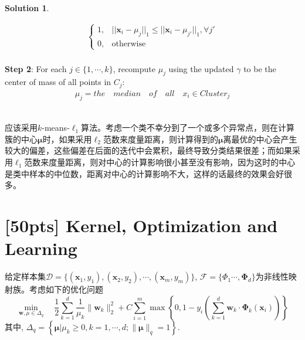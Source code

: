 \documentclass[a4paper,UTF8]{article}
\numberwithin{equation}{section}
\theoremstyle{definition}
\newtheorem*{solution}{Solution}
\begin{document}
\begin{solution}
\begin{algorithm}[]
{\begin{align*}
\begin{cases}
1,& ||\mathbf x_i - \mu_j||_1 \le ||\mathbf x_i - \mu_{j'}||_1, \forall j' \\
0, & \text{otherwise} 
\end{cases}
\end{align*}\\
\textbf{Step 2}: For each $j \in \{1, \cdots, k\}$, recompute $\mu_j$ using the updated $\gamma$ to be the center of mass of all points in $C_j$: 
\begin{align*}
\mu_j = the\quad median\quad of\quad all\quad x_i \in Cluster_j
\end{align*}
}
\end{algorithm}\\
应该采用$k$-means-$\ell_1$算法。考虑一个类不幸分到了一个或多个异常点，则在计算簇的中心$\boldsymbol\mu$时，如果采用$\ell_2$范数来度量距离，则计算得到的$\boldsymbol\mu$离最优的中心会产生较大的偏差，这些偏差在后面的迭代中会累积，最终导致分类结果很差；而如果采用$\ell_1$范数来度量距离，则对中心的计算影响很小甚至没有影响，因为这时的中心是类中样本的中位数，距离对中心的计算影响不大，这样的话最终的效果会好很多。\\
\end{solution}


\newpage
\section{[50pts] Kernel, Optimization and Learning}
给定样本集$\mathcal{D} = \{(\mathbf{x}_1,y_1),(\mathbf{x}_2,y_2),\cdots,(\mathbf{x}_m,y_m)\}$, $\mathcal{F} = \{\Phi_1 \cdots,\bm \Phi_d\}$为非线性映射族。考虑如下的优化问题
\begin{equation}
\label{eq-primal}
\min_{\mathbf w, \mu\in \Delta_q} \quad \frac{1}{2} \sum_{k=1}^d \frac{1}{\mu_k}\lVert\mathbf w_k\rVert_2^2 + C\sum_{i=1}^m \max\left\lbrace 0,1 - y_i\left(\sum_{k=1}^d \mathbf w_k \cdot \bm \Phi_k(\mathbf{x}_i)\right) \right\rbrace
\end{equation}
其中, $\Delta_q = \left\lbrace \bm{ \mu} | \mu_k\geq 0, k=1,\cdots,d; \lVert \bm{ \mu} \rVert_q = 1\right\rbrace$.
\end{document}
